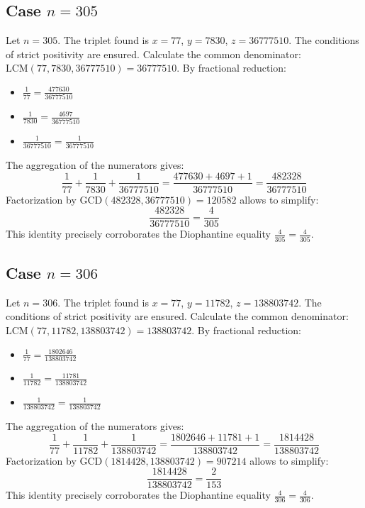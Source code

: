 \documentclass[11pt,a4paper]{article}
\begin{document}
\subsection{Case $n = 305$}
Let $n = 305$. The triplet found is $x = 77$, $y = 7830$, $z = 36777510$.
The conditions of strict positivity are ensured.
Calculate the common denominator: $\text{LCM}(77, 7830, 36777510) = 36777510$.
By fractional reduction:
\begin{itemize}
    \item $\frac{1}{77} = \frac{477630}{36777510}$
    \item $\frac{1}{7830} = \frac{4697}{36777510}$
    \item $\frac{1}{36777510} = \frac{1}{36777510}$
\end{itemize}
The aggregation of the numerators gives:
$$ \frac{1}{77} + \frac{1}{7830} + \frac{1}{36777510} = \frac{477630 + 4697 + 1}{36777510} = \frac{482328}{36777510} $$
Factorization by $\text{GCD}(482328, 36777510) = 120582$ allows to simplify:
$$ \frac{482328}{36777510} = \frac{4}{305} $$
This identity precisely corroborates the Diophantine equality $\frac{4}{305} = \frac{4}{305}$.

\subsection{Case $n = 306$}
Let $n = 306$. The triplet found is $x = 77$, $y = 11782$, $z = 138803742$.
The conditions of strict positivity are ensured.
Calculate the common denominator: $\text{LCM}(77, 11782, 138803742) = 138803742$.
By fractional reduction:
\begin{itemize}
    \item $\frac{1}{77} = \frac{1802646}{138803742}$
    \item $\frac{1}{11782} = \frac{11781}{138803742}$
    \item $\frac{1}{138803742} = \frac{1}{138803742}$
\end{itemize}
The aggregation of the numerators gives:
$$ \frac{1}{77} + \frac{1}{11782} + \frac{1}{138803742} = \frac{1802646 + 11781 + 1}{138803742} = \frac{1814428}{138803742} $$
Factorization by $\text{GCD}(1814428, 138803742) = 907214$ allows to simplify:
$$ \frac{1814428}{138803742} = \frac{2}{153} $$
This identity precisely corroborates the Diophantine equality $\frac{4}{306} = \frac{4}{306}$.
\end{document}
